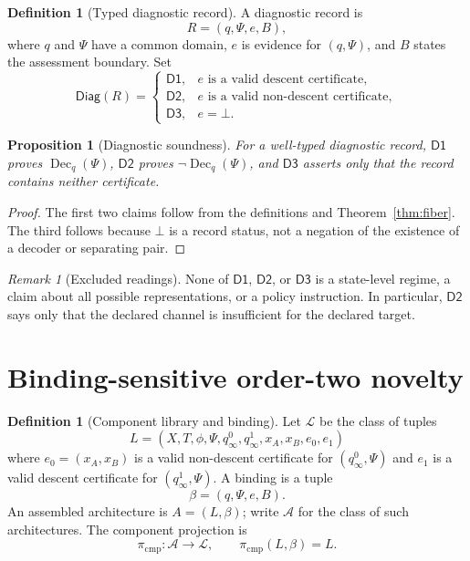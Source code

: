 \documentclass[11pt]{article}
\newcommand{\Xspace}{\ensuremath{X}}
\newcommand{\Endo}{\ensuremath{T}}
\newcommand{\Tail}{\ensuremath{\Psi}}
\newcommand{\Pred}{\ensuremath{\phi}}
\newcommand{\Diag}{\ensuremath{\mathsf{Diag}}}
\newcommand{\DOne}{\ensuremath{\mathsf{D1}}}
\newcommand{\DTwo}{\ensuremath{\mathsf{D2}}}
\newcommand{\DThree}{\ensuremath{\mathsf{D3}}}
\newcommand{\Lib}{\ensuremath{\mathcal L}}
\newcommand{\Arch}{\ensuremath{\mathcal A}}
\newcommand{\Dec}{\ensuremath{\operatorname{Dec}}}
\theoremstyle{plain}
\newtheorem{proposition}[theorem]{Proposition}
\theoremstyle{definition}
\newtheorem{definition}[theorem]{Definition}
\theoremstyle{remark}
\newtheorem{remark}[theorem]{Remark}
\begin{document}
\begin{definition}[Typed diagnostic record]
A diagnostic record is
\[
R=(q,\Tail,e,B),
\]
where $q$ and $\Tail$ have a common domain, $e$ is evidence for $(q,\Tail)$,
and $B$ states the assessment boundary.  Set
\[
\Diag(R)=
\begin{cases}
\DOne,&e\text{ is a valid descent certificate},\\
\DTwo,&e\text{ is a valid non-descent certificate},\\
\DThree,&e=\bot.
\end{cases}
\]
\end{definition}

\begin{proposition}[Diagnostic soundness]
\label{prop:diagnostic}
For a well-typed diagnostic record, $\DOne$ proves $\Dec_q(\Tail)$, $\DTwo$
proves $\neg\Dec_q(\Tail)$, and $\DThree$ asserts only that the record
contains neither certificate.
\end{proposition}

\begin{proof}
The first two claims follow from the definitions and Theorem~\ref{thm:fiber}.
The third follows because $\bot$ is a record status, not a negation of the
existence of a decoder or separating pair.
\end{proof}

\begin{remark}[Excluded readings]
None of $\DOne$, $\DTwo$, or $\DThree$ is a state-level regime, a claim about
all possible representations, or a policy instruction.  In particular,
$\DTwo$ says only that the declared channel is insufficient for the declared
target.
\end{remark}

\section{Binding-sensitive order-two novelty}
\label{sec:novelty}

\begin{definition}[Component library and binding]
Let $\Lib$ be the class of tuples
\[
L=(\Xspace,\Endo,\Pred,\Tail,q^0_\infty,q^1_\infty,x_A,x_B,e_0,e_1)
\]
where $e_0=(x_A,x_B)$ is a valid non-descent certificate for
$(q^0_\infty,\Tail)$ and $e_1$ is a valid descent certificate for
$(q^1_\infty,\Tail)$.  A binding is a tuple
\[
\beta=(q,\Tail,e,B).
\]
An assembled architecture is $A=(L,\beta)$; write $\Arch$ for the class of
such architectures.  The component projection is
\[
\pi_{\mathrm{cmp}}:\Arch\to\Lib,\qquad
\pi_{\mathrm{cmp}}(L,\beta)=L.
\]
\end{definition}
\end{document}
